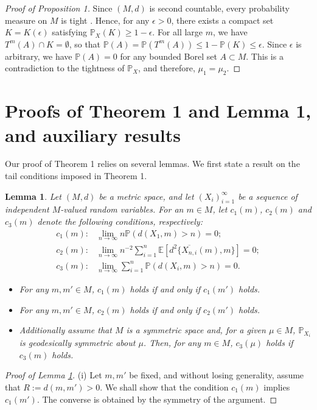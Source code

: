 \documentclass[preprint]{imsart}
\theoremstyle{plain}
\newtheorem{lemma}{Lemma}
\theoremstyle{remark}
\begin{document}
\begin{appendix}
\begin{proof}[Proof of Proposition 1]
Since $(M,d)$ is second countable, every probability measure on $M$ is tight \citep{lee2013smooth}. Hence, for any $\epsilon > 0$, there exists a compact set $K = K(\epsilon)$ satisfying $\mathbb{P}_X(K) \ge 1-\epsilon$. For all large $m$, we have $T^m(A) \cap K = \emptyset$, so that $\mathbb{P}(A) = \mathbb{P}(T^m(A)) \le 1 - \mathbb{P}(K) \le \epsilon$. 
%
Since $\epsilon$ is arbitrary, we have $\mathbb{P}(A) = 0$ for any bounded Borel set $A \subset M$. This is a contradiction to the tightness of $\mathbb{P}_{X}$, and therefore, $\mu_1 = \mu_2$.
\end{proof}


\section{Proofs of Theorem 1 and Lemma 1, and auxiliary results}
Our proof of Theorem 1 relies on several lemmas. We first state a result on the tail conditions imposed in Theorem 1. 

\begin{lemma}\label{lem:somevsall_tail_conditions} 
Let $(M,d)$ be a metric space, and let $(X_i)_{i=1}^\infty$ be a sequence of independent $M$-valued random variables. For an $m \in M$, let $c_1(m)$, $c_2(m)$ and $c_3(m)$ denote the following conditions, respectively: 
\begin{align*}
   c_1(m): & \lim_{n\to\infty} n\mathbb{P}(d(X_1,m) > n) = 0;\\
   c_2(m): & \lim_{n\to\infty} n^{-2}\sum_{i=1}^n\mathbb{E}[d^2\{\overline{X_{n,i}}(m),m\}] = 0;\\
   c_3(m): & \lim_{n\to\infty} \sum_{i=1}^n\mathbb{P}(d(X_i,m) > n) = 0.
\end{align*}
\begin{itemize}
    \item[(i)] For any $m,m' \in M$, $c_1(m)$ holds if and only if $c_1(m')$ holds.
    \item[(ii)] For any $m,m' \in M$, $c_2(m)$ holds if and only if $c_2(m')$ holds.
    \item[(iii)] Additionally assume that $M$ is a symmetric space and,  for a given $\mu \in M$, $\mathbb{P}_{X_i}$ is geodesically symmetric about $\mu$. Then, for any $m \in M$, $c_3(\mu)$ holds if $c_3(m)$ holds.
\end{itemize}
\end{lemma}


\begin{proof}[Proof of Lemma \ref{lem:somevsall_tail_conditions}]
(i) Let $m, m'$ be fixed, and without losing generality, assume that $R:= d(m,m') > 0$. We shall show that the condition $c_1(m)$ implies $c_1(m')$. The converse is obtained by the symmetry of the argument. 


\end{proof}
\end{appendix}
\end{document}

